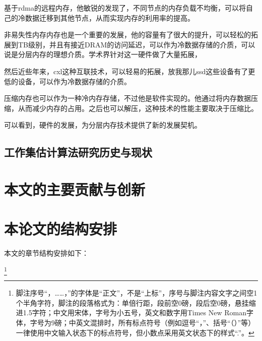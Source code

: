 基于rdma的远程内存，他敏锐的发现了，不同节点的内存负载不均衡，可以将自己的冷数据迁移到其他节点，从而实现内存的利用率的提高。

非易失性内存内存也是一个重要的发展，他的容量有了很大的提升，可以轻松的拓展到TB级别，并且有接近DRAM的访问延迟，可以作为冷数据存储的介质，可以说是分层内存的理想介质。学术界针对这一硬件做了大量拓展，

然后近些年来，cxl这种互联技术，可以轻易的拓展，放我那儿ssd这些设备有了更低的设备，可以作为冷数据存储的介质。

压缩内存也可以作为一种冷内存存储，不过他是软件实现的。他通过将内存数据压缩，从而减少内存的占用。之后也可以解压，这种技术的性能主要取决于压缩比。

可以看到，硬件的发展，为分层内存技术提供了新的发展契机。

\subsection{工作集估计算法研究历史与现状}
\section{本文的主要贡献与创新}


\section{本论文的结构安排}
本文的章节结构安排如下：

\footnote{脚注序号“，……，”的字体是“正文”，不是“上标”，序号与脚注内容文字之间空1个半角字符，脚注的段落格式为：单倍行距，段前空0磅，段后空0磅，悬挂缩进1.5字符；中文用宋体，字号为小五号，英文和数字用Times New Roman字体，字号为9磅；中英文混排时，所有标点符号（例如逗号“，”、括号“（）”等）一律使用中文输入状态下的标点符号，但小数点采用英文状态下的样式“.”。}